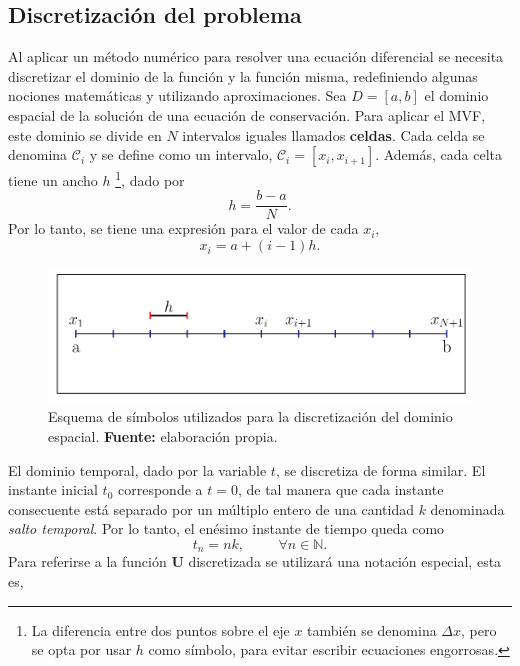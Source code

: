 \subsection{Discretización del problema}
Al aplicar un método numérico para resolver una ecuación diferencial se necesita discretizar el dominio de la función y la función misma, redefiniendo algunas nociones matemáticas y utilizando aproximaciones. Sea  $D = [a,b]$ el dominio espacial de la solución de una ecuación de conservación. Para aplicar el MVF, este dominio se divide en $N$ intervalos iguales llamados \textbf{celdas}. Cada celda se denomina $\mathcal{C}_i$ y se define como un intervalo, $\mathcal{C}_i = [x_i, x_{i+1}]$. Además, cada celta tiene un ancho $h$ \footnote{La diferencia entre dos puntos sobre el eje $x$ también se denomina $\Delta x$, pero se opta por usar $h$ como símbolo, para evitar escribir ecuaciones engorrosas.}, dado por
\begin{equation}
	h = \frac{b-a}{N}.
\end{equation}
Por lo tanto, se tiene una expresión para el valor de cada $x_i$,
\begin{equation}
	x_i = a + (i-1)h.
\end{equation} 
\begin{figure}[ht]
	\centering
	\includegraphics[width=\linewidth]{../some_plots/cap2/graficas/domain.pdf}
	\caption{Esquema de símbolos utilizados para la discretización del dominio espacial. \textbf{Fuente:} elaboración propia.}
	\label{fig:discretizacion-eje-x}
\end{figure}
El dominio temporal, dado por la variable $t$, se discretiza de forma similar. El instante inicial $t_0$ corresponde a $t=0$, de tal manera que cada instante consecuente está separado por un múltiplo entero de una cantidad $k$ denominada \textit{salto temporal}. Por lo tanto, el enésimo instante de tiempo queda como
\begin{equation}
	t_n = nk, \hspace{1cm} \forall n \in \mathbb{N}.
\end{equation}
Para referirse a la función $\mathbf{U}$ discretizada se utilizará una notación especial, esta es,
